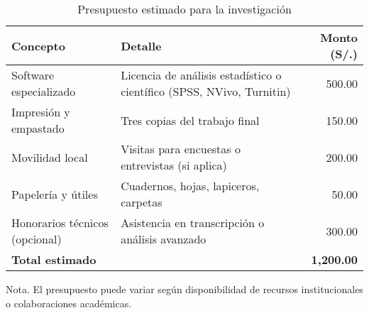 \begin{table}[H]
\centering
\begin{threeparttable}
\caption{Presupuesto estimado para la investigación}
\label{tab:presupuesto}
\begin{tabular}{@{}p{6.5cm}p{4.5cm}r@{}}
\toprule
\textbf{Concepto} & \textbf{Detalle} & \textbf{Monto (S/.)} \\
\midrule
Software especializado & Licencia de análisis estadístico o científico (SPSS, NVivo, Turnitin) & 500.00 \\
Impresión y empastado & Tres copias del trabajo final & 150.00 \\
Movilidad local & Visitas para encuestas o entrevistas (si aplica) & 200.00 \\
Papelería y útiles & Cuadernos, hojas, lapiceros, carpetas & 50.00 \\
Honorarios técnicos (opcional) & Asistencia en transcripción o análisis avanzado & 300.00 \\
\textbf{Total estimado} &  & \textbf{1,200.00} \\
\bottomrule
\end{tabular}
\begin{tablenotes}
\item Nota. El presupuesto puede variar según disponibilidad de recursos institucionales o colaboraciones académicas.
\end{tablenotes}
\end{threeparttable}
\end{table}


